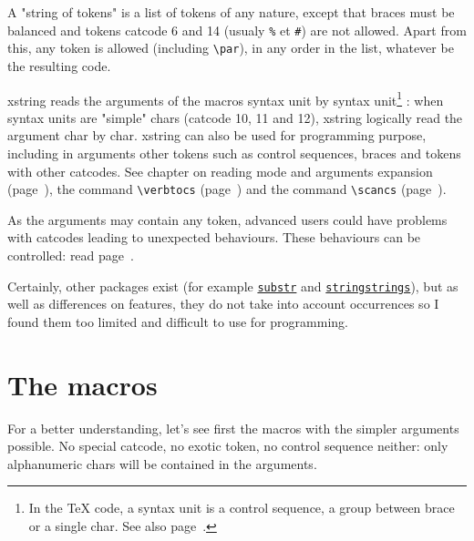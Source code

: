 \documentclass[english,a4paper,10pt]{article}
\newcommand\guill[1]{"#1"}
\newcommand\US{syntax unit\xspace}
\newcommand\USs{syntax units\xspace}
\newcommand\Xstring{\textsf{xstring}\xspace}
\begin{document}
A "string of tokens" is a list of tokens of any nature, except that braces must be balanced and tokens catcode 6 and 14 (usualy \verb|%| et \verb|#|) are not allowed. Apart from this, any token is allowed (including \verb|\par|), in any order in the list, whatever be the resulting code.\medskip

\Xstring reads the arguments of the macros \US by \US\footnote{In the \TeX{} code, a \US is a control sequence, a group between brace or a single char. See also page~\pageref{developpementarguments}.} : when \USs are \guill{simple} chars (catcode 10, 11 and 12), \Xstring logically read the argument char by char. \Xstring can also be used for programming purpose, including in arguments other tokens such as control sequences, braces and tokens with other catcodes. See chapter on reading mode and arguments expansion (page~\pageref{developpementarguments}), the command \verb|\verbtocs| (page~\pageref{verbtocs}) and the command \verb|\scancs| (page~\pageref{scancs}).\medskip

As the arguments may contain any token, advanced users could have problems with catcodes leading to unexpected behaviours. These behaviours can be controlled: read page~\pageref{macrosetoilees}.\medskip

Certainly, other packages exist (for example \href{http://mirror.ctan.org/tex-archive/macros/latex/contrib/substr/}{\nolinkurl{substr}} and \href{http://mirror.ctan.org/tex-archive/macros/latex/contrib/stringstrings/}{\nolinkurl{stringstrings}}), but as well as differences on features, they do not take into account occurrences so I found them too limited and difficult to use for programming.

\section{The macros}
For a better understanding, let's see first the macros with the simpler arguments possible. No special catcode, no exotic token, no control sequence neither: only alphanumeric chars will be contained in the arguments.\medskip
\end{document}
